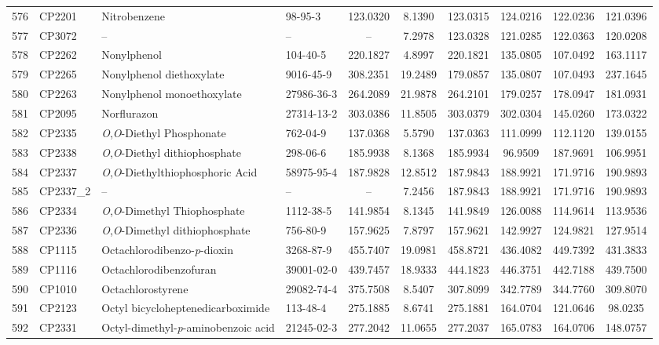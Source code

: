 \begin{longtable}{clllcccccc}
576 & CP2201 & Nitrobenzene & 98-95-3 & 123.0320 & 8.1390 & 123.0315 & 124.0216 & 122.0236 & 121.0396 \\ 
577 & CP3072 & – & – & – & 7.2978 & 123.0328 & 121.0285 & 122.0363 & 120.0208 \\ 
578 & CP2262 & Nonylphenol & 104-40-5 & 220.1827 & 4.8997 & 220.1821 & 135.0805 & 107.0492 & 163.1117 \\ 
579 & CP2265 & Nonylphenol diethoxylate & 9016-45-9 & 308.2351 & 19.2489 & 179.0857 & 135.0807 & 107.0493 & 237.1645 \\ 
580 & CP2263 & Nonylphenol monoethoxylate & 27986-36-3 & 264.2089 & 21.9878 & 264.2101 & 179.0257 & 178.0947 & 181.0931 \\ 
581 & CP2095 & Norflurazon & 27314-13-2 & 303.0386 & 11.8505 & 303.0379 & 302.0304 & 145.0260 & 173.0322 \\ 
582 & CP2335 & \textit{O},\textit{O}-Diethyl Phosphonate & 762-04-9 & 137.0368 & 5.5790 & 137.0363 & 111.0999 & 112.1120 & 139.0155 \\ 
583 & CP2338 & \textit{O},\textit{O}-Diethyl dithiophosphate & 298-06-6 & 185.9938 & 8.1368 & 185.9934 & 96.9509 & 187.9691 & 106.9951 \\ 
584 & CP2337 & \textit{O},\textit{O}-Diethylthiophosphoric Acid & 58975-95-4 & 187.9828 & 12.8512 & 187.9843 & 188.9921 & 171.9716 & 190.9893 \\ 
585 & CP2337\_2 & – & – & – & 7.2456 & 187.9843 & 188.9921 & 171.9716 & 190.9893 \\ 
586 & CP2334 & \textit{O},\textit{O}-Dimethyl Thiophosphate & 1112-38-5 & 141.9854 & 8.1345 & 141.9849 & 126.0088 & 114.9614 & 113.9536 \\ 
587 & CP2336 & \textit{O},\textit{O}-Dimethyl dithiophosphate & 756-80-9 & 157.9625 & 7.8797 & 157.9621 & 142.9927 & 124.9821 & 127.9514 \\ 
588 & CP1115 & Octachlorodibenzo-\textit{p}-dioxin & 3268-87-9 & 455.7407 & 19.0981 & 458.8721 & 436.4082 & 449.7392 & 431.3833 \\ 
589 & CP1116 & Octachlorodibenzofuran & 39001-02-0 & 439.7457 & 18.9333 & 444.1823 & 446.3751 & 442.7188 & 439.7500 \\ 
590 & CP1010 & Octachlorostyrene & 29082-74-4 & 375.7508 & 8.5407 & 307.8099 & 342.7789 & 344.7760 & 309.8070 \\ 
591 & CP2123 & Octyl bicycloheptenedicarboximide & 113-48-4 & 275.1885 & 8.6741 & 275.1881 & 164.0704 & 121.0646 & 98.0235 \\ 
592 & CP2331 & Octyl-dimethyl-\textit{p}-aminobenzoic acid & 21245-02-3 & 277.2042 & 11.0655 & 277.2037 & 165.0783 & 164.0706 & 148.0757 \\ 

\end{longtable}
